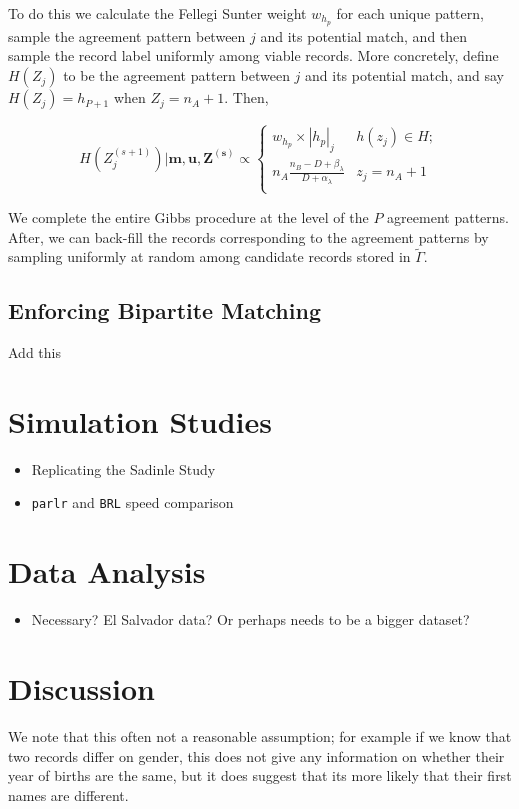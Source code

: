 \documentclass[
  12pt,
]{article}
\providecommand{\tightlist}{%
  \setlength{\itemsep}{0pt}\setlength{\parskip}{0pt}}
\begin{document}
To do this we calculate the Fellegi Sunter weight \(w_{h_p}\) for each
unique pattern, sample the agreement pattern between \(j\) and its
potential match, and then sample the record label uniformly among viable
records. More concretely, define \(H(Z_j)\) to be the agreement pattern
between \(j\) and its potential match, and say \(H(Z_j) = h_{P+1}\) when
\(Z_j = n_A + 1\). Then,

\[H\left(Z_j^{(s+1)}\right) | \mathbf{m}, \mathbf{u}, \mathbf{Z^{(s)}} \propto
\begin{cases} 
    w_{h_p}\times |h_p|_j  & h(z_j) \in H; \\
     n_A \frac{n_B - D + \beta_{\lambda}}{D + \alpha_{\lambda}} &  z_j  = n_A + 1 \\
\end{cases}\]

We complete the entire Gibbs procedure at the level of the \(P\)
agreement patterns. After, we can back-fill the records corresponding to
the agreement patterns by sampling uniformly at random among candidate
records stored in \(\tilde{\Gamma}\).

\hypertarget{enforcing-bipartite-matching}{%
\subsection{Enforcing Bipartite
Matching}\label{enforcing-bipartite-matching}}

Add this

\hypertarget{simulation-studies}{%
\section{Simulation Studies}\label{simulation-studies}}

\begin{itemize}
\item
  Replicating the Sadinle Study
\item
  \texttt{parlr} and \texttt{BRL} speed comparison
\end{itemize}

\hypertarget{data-analysis}{%
\section{Data Analysis}\label{data-analysis}}

\begin{itemize}
\tightlist
\item
  Necessary? El Salvador data? Or perhaps needs to be a bigger dataset?
\end{itemize}

\hypertarget{discussion}{%
\section{Discussion}\label{discussion}}

We note that this often not a reasonable assumption; for example if we
know that two records differ on gender, this does not give any
information on whether their year of births are the same, but it does
suggest that its more likely that their first names are different.
\end{document}
